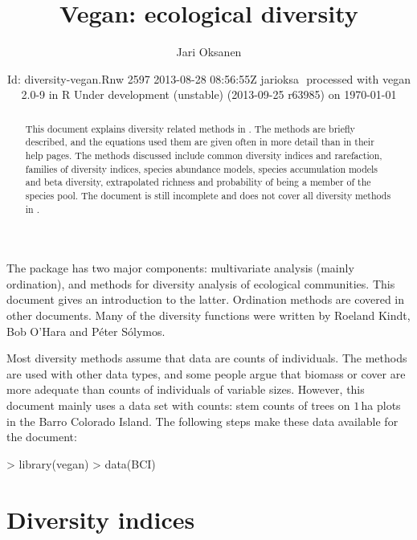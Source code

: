 \documentclass[a4paper,10pt,twocolumn]{article}
\title{Vegan: ecological diversity} \author{Jari Oksanen}
\date{\footnotesize{$ $Id: diversity-vegan.Rnw 2597 2013-08-28 08:56:55Z jarioksa $ $
  processed with vegan 2.0-9
  in R Under development (unstable) (2013-09-25 r63985) on \today}}
\begin{document}




\maketitle
\begin{abstract} 
  This document explains diversity related methods in
  . The methods are briefly described, and the equations
  used them are given often in more detail than in their help
  pages. The methods discussed include common diversity indices and
  rarefaction, families of diversity indices, species abundance
  models, species accumulation models and beta diversity, extrapolated
  richness and probability of being a member of the species pool. The
  document is still incomplete and does not cover all diversity
  methods in .
\end{abstract}
\tableofcontents


\noindent The  package has two major components:
multivariate analysis (mainly ordination), and methods for diversity
analysis of ecological communities.  This document gives an
introduction to the latter.  Ordination methods are covered in other
documents.  Many of the diversity functions were written by Roeland
Kindt, Bob O'Hara and P{\'e}ter S{\'o}lymos.

Most diversity methods assume that data are counts of individuals.
The methods are used with other data types, and some people argue that
biomass or cover are more adequate than counts of individuals of
variable sizes.  However, this document mainly uses a data set with
counts: stem counts of trees on $1$\,ha plots in the Barro Colorado
Island.  The following steps make these data available for the
document:
\begin{Schunk}
\begin{Sinput}
> library(vegan)
> data(BCI)
\end{Sinput}
\end{Schunk}

\section{Diversity indices}
\end{document}
